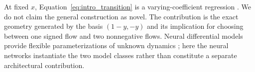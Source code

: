At fixed $x$, Equation~\eqref{eq:intro_transition} is a varying-coefficient regression \citep{hastie1993}. We do not claim the general construction as novel. The contribution is the exact geometry generated by the basis $(1-y,-y)$ and its implication for choosing between one signed flow and two nonnegative flows. Neural differential models provide flexible parameterizations of unknown dynamics \citep{chen2018}; here the neural networks instantiate the two model classes rather than constitute a separate architectural contribution.
